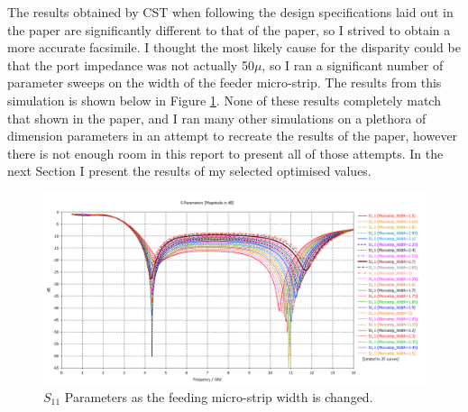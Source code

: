 \documentclass[colorlinks,11pt,a4paper,normalphoto,withhyper,ragged2e]{altareport}
\begin{document}
The results obtained by CST when following the design specifications laid out in the paper are significantly different to that of the paper, so I strived to obtain a more accurate facsimile. I thought the most likely cause for the disparity could be that the port impedance was not actually 50$\mu$, so I ran a significant number of parameter sweeps on the width of the feeder micro-strip. The results from this simulation is shown below in Figure \ref{fig:microstrip_param_sweep}. \linebreak  
None of these results completely match that shown in the paper, and I ran many other simulations on a plethora of dimension parameters in an attempt to recreate the results of the paper, however there is not enough room in this report to present all of those attempts. In the next Section I present the results of my selected optimised values. \linebreak


\begin{figure}[ht]
	\centering
	\hspace{\fill}\includegraphics[width=14cm,valign=c]{Images/S1,1-microstrip-param-sweep.png}\hspace{\fill}
	\caption{$S_{11}$ Parameters as the feeding micro-strip width is changed.}  %
	\label{fig:microstrip_param_sweep}
\end{figure}


\newpage
\end{document}
